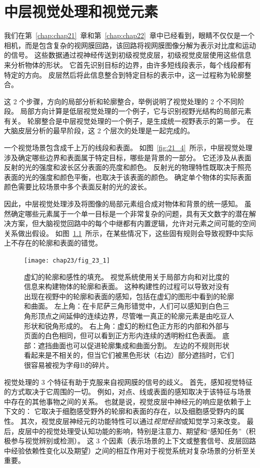 \chapter{中层视觉处理和视觉元素} \label{chap:chap23}

我们在第~\ref{chap:chap21}~章和第~\ref{chap:chap22}~章中已经看到，眼睛不仅仅是一个相机，而是包含复杂的视网膜回路，该回路将视网膜图像分解为表示对比度和运动的信号。
这些数据通过视神经传送到初级视觉皮层，初级视觉皮层使用这些信息来分析物体的形状。
它首先识别目标的边界，由许多短线段表示，每个线段都有特定的方向。
皮层然后将此信息整合到特定目标的表示中，这一过程称为轮廓整合。


这 2 个步骤，方向的局部分析和轮廓整合，举例说明了视觉处理的 2 个不同阶段。
局部方向计算是低层视觉处理的一个例子，它与识别视野光结构的局部元素有关。
轮廓整合是中层视觉处理的一个例子，是生成统一视野表示的第一步。
在大脑皮层分析的最早阶段，这 2 个层次的处理是一起完成的。
 

一个视觉场景包含成千上万的线段和表面。
如图~\ref{fig:21_4}~所示，中层视觉处理涉及确定哪些边界和表面属于特定目标，哪些是背景的一部分。
它还涉及从表面反射的光的强度和波长区分表面的亮度和颜色。
反射光的物理特性既取决于照亮表面的光的强度和颜色平衡，也取决于该表面的颜色。
确定单个物体的实际表面颜色需要比较场景中多个表面反射的光的波长。


因此，中层视觉处理涉及将图像的局部元素组合成对物体和背景的统一感知。
虽然确定哪些元素属于一个单一目标是一个非常复杂的问题，具有天文数字的潜在解决方案，但大脑视觉回路中的每个中继都有内置逻辑，允许对元素之间可能的空间关系做出假设。
如图~\ref{fig:23_1}~所示，在某些情况下，这些固有规则会导致视野中实际上不存在的轮廓和表面的错觉。


\begin{figure}[htbp]
	\centering
	\texttt{[image: chap23/fig\_23\_1]}
	\caption{虚幻的轮廓和感性的填充。
		视觉系统使用关于局部方向和对比度的信息来构建物体的轮廓和表面。
		这种构建性的过程可以导致对没有出现在视野中的轮廓和表面的感知，包括在虚幻的图形中看到的轮廓和曲面。
		左上角：在卡尼萨三角形错觉中，人们可以感知到白色三角形顶点之间延伸的连续边界，尽管唯一真正的轮廓元素是由吃豆人形状和锐角形成的。
		右上角：虚幻的粉红色正方形的内部和外部与页面的白色相同，但可以看到正方形内连续的透明粉红色表面。
		底部：遮挡曲面也可以促进轮廓集成和曲面分割。
		左边的不规则形状看起来是不相关的，但当它们被黑色形状（右边）部分遮挡时，它们很容易被视为字母B的碎片。}
	\label{fig:23_1}
\end{figure}


视觉处理的 3 个特征有助于克服来自视网膜的信号的歧义。
首先，感知视觉特征的方式取决于它周围的一切。
例如，对点、线或表面的感知取决于该特征与场景中存在的其他事物之间的关系。
也就是说，视觉皮层中神经元的响应是依赖于上下文的：
它取决于细胞感受野外的轮廓和表面的存在，以及细胞感受野内的属性。
其次，视觉皮层神经元的功能特性可以通过\textit{视觉经验}或知觉学习来改变。
最后，皮层中的视觉处理受认知功能的影响，特别是注意力、期望和“感知任务”（积极参与视觉辨别或检测）。
这 3 个因素（表示场景的上下文或整套信号、皮层回路中经验依赖性变化以及期望）之间的相互作用对于视觉系统对复杂场景的分析至关重要。


